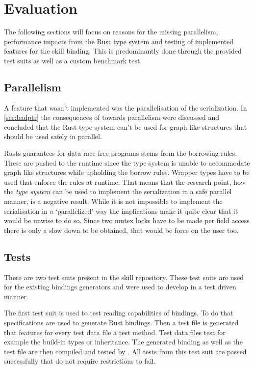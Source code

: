 \documentclass[thesis]{subfiles}
\begin{document}
\chapter{Evaluation}\label{chap:eval}
The following sections will focus on reasons for the missing parallelism, performance impacts from the Rust type system and testing of implemented features for the \gls{skill} binding.
This is predominantly done through the provided test suits as well as a custom benchmark test.

\section{Parallelism}
  A feature that wasn't implemented was the parallelisation of the serialization.
  In \autoref{sec:badptr} the consequences of \PtrT towards parallelism were discussed and concluded that the Rust type system can't be used for graph like structures that should be used safely in parallel.

  Rusts guarantees for data race free programs stems from the borrowing rules.
  These are pushed to the runtime since the type system is unable to accommodate graph like structures while upholding the borrow rules.
  Wrapper types have to be used that enforce the rules at runtime.
  That means that the research point, how the \emph{type system} can be used to implement the serialization in a safe parallel manner, is a negative result.
  While it is not impossible to implement the serialisation in a `parallelized' way the implications make it quite clear that it would be unwise to do so.
  Since two mutex locks have to be made per field access there is only a slow down to be obtained, that would be force on the user too.

\section{Tests}
  There are two test suits present in the \gls{skill} repository\autocite{skill-repo}.
  These test suits are used for the existing bindings generators and were used to develop in a test driven manner.

  The first test suit is used to test reading capabilities of bindings.
  To do that specifications are used to generate Rust bindings.
  Then a test file is generated that features for every test data file a test method.
  Test data files test for example the build-in types or inheritance.
  The generated binding as well as the test file are then compiled and tested by .
  All tests from this test suit are passed successfully that do not require restrictions to fail.
\end{document}
